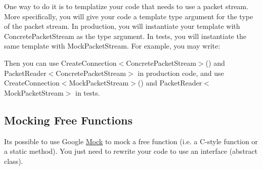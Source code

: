 One way to do it is to templatize your code that needs to use a packet stream. More specifically, you will give your code a template type argument for the type of the packet stream. In production, you will instantiate your template with {\ttfamily Concrete\+Packet\+Stream} as the type argument. In tests, you will instantiate the same template with {\ttfamily Mock\+Packet\+Stream}. For example, you may write\+:


\begin{DoxyCode}{0}
\DoxyCodeLine{}
\DoxyCodeLine{ \textcolor{keyword}{public}:}
\DoxyCodeLine{\};}
\end{DoxyCode}


Then you can use {\ttfamily Create\+Connection$<$Concrete\+Packet\+Stream$>$()} and {\ttfamily Packet\+Reader$<$Concrete\+Packet\+Stream$>$} in production code, and use {\ttfamily Create\+Connection$<$Mock\+Packet\+Stream$>$()} and {\ttfamily Packet\+Reader$<$Mock\+Packet\+Stream$>$} in tests.


\begin{DoxyCode}{0}
\end{DoxyCode}


\subsection*{Mocking Free Functions}

It\textquotesingle{}s possible to use Google \mbox{\hyperlink{class_mock}{Mock}} to mock a free function (i.\+e. a C-\/style function or a static method). You just need to rewrite your code to use an interface (abstract class).

